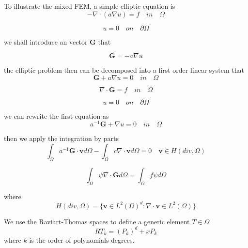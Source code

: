 To illustrate the mixed FEM, a simple elliptic equation is
\begin{equation}
- \nabla \cdot (a \nabla u) = f \quad in \quad \Omega
\end{equation}

\begin{equation}
u = 0 \quad on \quad \partial \Omega
\end{equation}

we shall introduce an vector $ \mathbf{G} $ that

\begin{equation}
\mathbf{G} = -a \nabla u
\end{equation}

the elliptic problem then can be decomposed into a first order linear system that
\begin{equation}
\mathbf{G} + a \nabla u = 0 \quad in \quad \Omega
\end{equation}

\begin{equation}
\nabla \cdot \mathbf{G} = f \quad in  \quad \Omega 
\end{equation}

\begin{equation}
u = 0 \quad  on  \quad \partial \Omega 
\end{equation}

we can rewrite the first equation as
\begin{equation}
a^{-1} \mathbf{G} + \nabla u = 0 \quad in \quad \Omega 
\end{equation}

then we apply the integration by parts
\begin{equation}
\int_{\Omega} a^{-1} \mathbf{G} \cdot \mathbf{v} d\Omega - \int_{\Omega} c \nabla \cdot \mathbf{v} d\Omega = 0 \quad \mathbf{v} \in H(div, \Omega)
\end{equation}

\begin{equation}
\int_{\Omega} \psi \nabla \cdot \mathbf{G} d\Omega = \int_{\Omega} f \psi d\Omega 
\end{equation}

where 
\begin{equation}
H(div, \Omega) = \{\mathbf{v} \in L^{2}(\Omega)^{d} : \nabla \cdot \mathbf{v} \in L^{2}(\Omega) \}
\end{equation}

We use the Raviart-Thomas spaces to define a generic element $ T \in \Omega $
\begin{equation}
RT_{k} = (P_{k})^{d} + xP_{k}
\end{equation}
where $ k  $ is the order of polynomials degrees.

